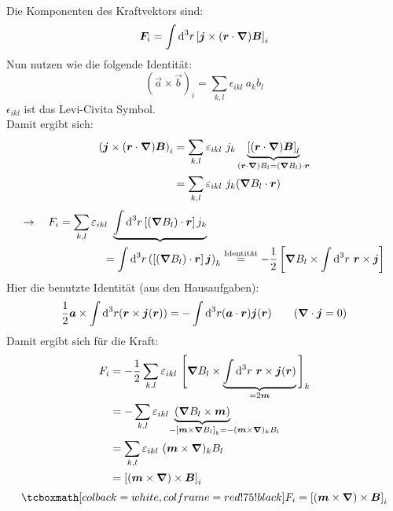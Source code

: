 \\
Die Komponenten des Kraftvektors sind:
\begin{equation*}
\bm{F}_i = \int \textrm{d}^3 r \left[\bm{j} \times (\bm{r} \cdot \bm{\nabla}) \bm{B}\right]_i
\end{equation*}
Nun nutzen wie die folgende Identität:
\begin{equation*}
(\vec{a} \times \vec{b})_i = \sum_{k,l} \epsilon_{ikl} \ a_k b_l
\end{equation*}
$ \epsilon_{ikl} $ ist das Levi-Civita Symbol.\\
Damit ergibt sich:
\begin{align*}
\left(\bm{j} \times (\bm{r} \cdot \bm{\nabla}) \bm{B}\right)_i &= \sum_{k,l} \varepsilon_{ikl} \  j_k \underbrace{\left[(\bm{r} \cdot \bm{\nabla}) \bm{B}\right]_l}_{(\bm{r} \cdot \bm{\nabla}) B_l = (\bm{\nabla} B_l) \cdot \bm{r}}\\
&= \sum_{k,l} \varepsilon_{ikl} \ j_k (\bm{\nabla} B_l \cdot \bm{r})
\end{align*}
\begin{align*}
\rightarrow \quad F_i &= \sum_{k,l} \varepsilon_{ikl} \ \underbrace{\int \textrm{d} ^3 r \left[(\bm{\nabla} B_l) \cdot \bm{r}\right] j_k}\\
&\qquad \qquad = \int \textrm{d}^3 r \left( \left[(\bm{\nabla} B_l) \cdot \bm{r}\right] \bm{j}\right)_k \overset{\textrm{Identität}}{=} - \frac{1}{2} \left[\bm{\nabla} B_l \times \int \textrm{d}^3 r \ \bm{r} \times \bm{j} \right]
\end{align*}
Hier die benutzte Identität (aus den Hausaufgaben):
\begin{equation*}
\frac{1}{2} \bm{a} \times \int \textrm{d} ^3 r (\bm{r} \times \bm{j} (\bm{r})) = - \int \textrm{d}^3 r (\bm{a} \cdot \bm{r}) \bm{j}(\bm{r}) \qquad (\bm{\nabla} \cdot \bm{j} = 0)
\end{equation*}
Damit ergibt sich für die Kraft:
\begin{align*}
F_i &= - \frac{1}{2} \sum_{k,l} \epsilon_{ikl} \ \Bigg[\vabla B_l \times \ub{\int \dd^3 r \ \vec{r} \times \vec{j}(\vec{r})}_{=2 \vec{m}}\Bigg]_k \\
&= - \sum_{k,l} \epsilon_{ikl} \ \ub{\left(\vabla B_l \times \vec{m}\right)}_{\mathclap{ \qquad \qquad - \left[\vec{m} \times \vabla B_l\right]_k = - (\vec{m} \times \vabla)_k B_l}}\\
&= \sum_{k,l} \epsilon_{ikl} \ (\vec{m} \times \vabla)_k B_l\\
&= \left[(\vec{m} \times \vabla) \times \vec{B}\right]_i
\end{align*}
\begin{equation*}
\rmbox{F_i = \left[(\vec{m} \times \vabla) \times \vec{B}\right]_i}
\end{equation*}
